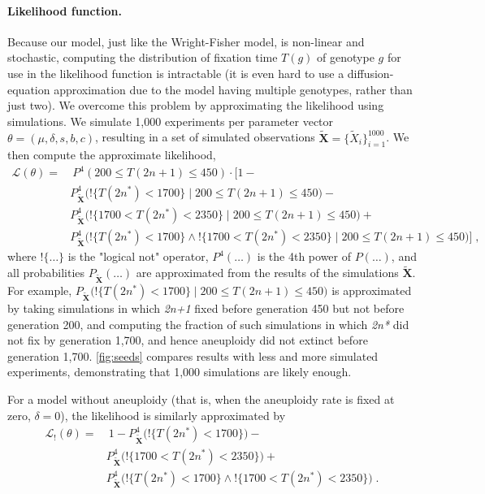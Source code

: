 \documentclass[12pt]{extarticle}
\let\vec\mathbf
\newcommand{\likelihood}{\mathcal{L}}
\newcommand{\anwt}{\emph{2n+1}}
\newcommand{\eumt}{\emph{2n*}}
\begin{document}
\paragraph{Likelihood function.} 
Because our model, just like the Wright-Fisher model, is non-linear and stochastic, computing the distribution of fixation time $T(g)$ of genotype $g$ for use in the likelihood function is intractable (it is even hard to use a diffusion-equation approximation due to the model having multiple genotypes, rather than just two).
We overcome this problem by approximating the likelihood using simulations. We simulate 1,000 experiments per parameter vector $\theta = (\mu, \delta, s, b, c)$, resulting in a set of simulated observations $\tilde{\vec X} = \{\tilde{X}_i\}_{i=1}^{1000}$. We then compute the approximate likelihood,
\begin{equation}\begin{aligned}
\label{eq:heatstress-likelihood}
\likelihood(\theta) = &\ P^4(200 \le T(2n+1) \le 450) \cdot 
	\Big[1 - \\
	&	P_{\tilde{\vec X}}^4\big(!\{T(2n^*)<1700\} \mid 200 \le T(2n+1) \le 450\big)- \\
	&	P_{\tilde{\vec X}}^4\big(!\{1700 < T(2n^*) < 2350\} \mid 200 \le T(2n+1) \le 450\big)+ \\
	&	P_{\tilde{\vec X}}^4\big(!\{T(2n^*)<1700\} \land !\{1700 < T(2n^*) < 2350\} \mid 200 \le T(2n+1) \le 450\big) 
	\Big]\;,
\end{aligned}\end{equation}
where $!\{\ldots\}$ is the "logical not" operator, $P^4(\ldots)$ is the 4th power of $P(\ldots)$, and all probabilities $P_{\tilde{\vec X}}(\ldots)$ are approximated from the results of the simulations $\tilde{\vec X}$. For example, $P_{\tilde{\vec X}}\big(!\{T(2n^*)<1700\} \mid 200 \le T(2n+1) \le 450\big)$ is approximated by taking simulations in which \anwt\; fixed before generation 450 but not before generation 200, and computing the fraction of such simulations in which \eumt\; did not fix by generation 1,700, and hence aneuploidy did not extinct before generation 1,700.
\cref{fig:seeds} compares results with less and more simulated experiments, demonstrating that 1,000 simulations are likely enough.
 
For a model without aneuploidy (that is, when the aneuploidy rate is fixed at zero, $\delta=0$), 
the likelihood is similarly approximated by
\begin{equation}\begin{aligned}
\label{eq:heatstress-noaneuploidy-likelihood}
\likelihood_{!}(\theta) = &\ 
	1 - 
	P_{\tilde{\vec X}}^4\big(!\{T(2n^*)<1700\}\big) - \\
&	P_{\tilde{\vec X}}^4\big(!\{1700 < T(2n^*) < 2350\}\big) + \\
&	P_{\tilde{\vec X}}^4\big(!\{T(2n^*)<1700\} \land !\{1700 < T(2n^*) < 2350\}\big)
\;.
\end{aligned}\end{equation}
\end{document}

